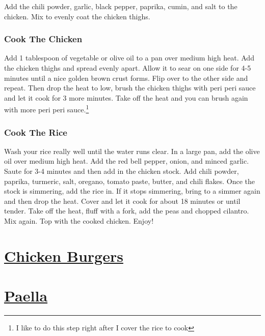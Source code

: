 \documentclass[]{article}
\begin{document}
Add the chili powder, garlic, black pepper, paprika, cumin, and salt to the chicken. Mix to evenly coat the chicken thighs.

\hypertarget{cook-the-chicken}{%
\subsubsection{Cook The Chicken}\label{cook-the-chicken}}

Add 1 tablespoon of vegetable or olive oil to a pan over medium high heat. Add the chicken thighs and spread evenly apart. Allow it to sear on one side for 4-5 minutes until a nice golden brown crust forms. Flip over to the other side and repeat. Then drop the heat to low, brush the chicken thighs with peri peri sauce and let it cook for 3 more minutes. Take off the heat and you can brush again with more peri peri sauce.\footnote{I like to do this step right after I cover the rice to cook}

\hypertarget{cook-the-rice}{%
\subsubsection{Cook The Rice}\label{cook-the-rice}}

Wash your rice really well until the water runs clear. In a large pan, add the olive oil over medium high heat. Add the red bell pepper, onion, and minced garlic. Saute for 3-4 minutes and then add in the chicken stock. Add chili powder, paprika, turmeric, salt, oregano, tomato paste, butter, and chili flakes. Once the stock is simmering, add the rice in. If it stops simmering, bring to a simmer again and then drop the heat. Cover and let it cook for about 18 minutes or until tender. Take off the heat, fluff with a fork, add the peas and chopped cilantro. Mix again. Top with the cooked chicken. Enjoy!

\hypertarget{chicken-burgers}{%
\section{\texorpdfstring{\href{https://www.foodnetwork.com/recipes/rachael-ray/bbq-chicken-burgers-with-slaw-recipe-1917239}{Chicken Burgers}}{Chicken Burgers}}\label{chicken-burgers}}

\hypertarget{paella}{%
\section{\texorpdfstring{\href{https://www.seriouseats.com/recipes/2019/09/stovetop-paella-mixta-for-two-with-chicken-and-shrimp.html}{Paella}}{Paella}}\label{paella}}
\end{document}
